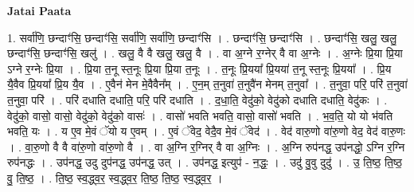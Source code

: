 \documentclass[17pt]{extarticle}
\begin{document}
\textbf{Jatai Paata} \newline

1. सर्वा॑णि॒ छन्दाꣳ॑सि॒ छन्दाꣳ॑सि॒ सर्वा॑णि॒ सर्वा॑णि॒ छन्दाꣳ॑सि । . छन्दाꣳ॑सि॒ छन्दाꣳ॑सि । . छन्दाꣳ॑सि॒ खलु॒ खलु॒ छन्दाꣳ॑सि॒ छन्दाꣳ॑सि॒ खलु॑ । . खलु॒ वै वै खलु॒ खलु॒ वै । . वा अ॒ग्ने र॒ग्नेर् वै वा अ॒ग्नेः । . अ॒ग्नेः प्रि॒या प्रि॒या ऽग्ने र॒ग्नेः प्रि॒या । . प्रि॒या त॒नू स्त॒नूः प्रि॒या प्रि॒या त॒नूः । . त॒नूः प्रि॒यया᳚ प्रि॒यया॑ त॒नू स्त॒नूः प्रि॒यया᳚ । . प्रि॒य यै॒वैव प्रि॒यया᳚ प्रि॒य यै॒व । . ए॒वैन॑ मेन मे॒वैवैन᳚म् । . ए॒न॒म् त॒नुवा॑ त॒नुवै॑न मेनम् त॒नुवा᳚ । . त॒नुवा॒ परि॒ परि॑ त॒नुवा॑ त॒नुवा॒ परि॑ । . परि॑ दधाति दधाति॒ परि॒ परि॑ दधाति । . द॒धा॒ति॒ वेदु॑को॒ वेदु॑को दधाति दधाति॒ वेदु॑कः । . वेदु॑को॒ वासो॒ वासो॒ वेदु॑को॒ वेदु॑को॒ वासः॑ । . वासो॑ भवति भवति॒ वासो॒ वासो॑ भवति । . भ॒व॒ति॒ यो यो भ॑वति भवति॒ यः । . य ए॒व मे॒वं ॅयो य ए॒वम् । . ए॒वं ॅवेद॒ वेदै॒व मे॒वं ॅवेद॑ । . वेद॑ वारु॒णो वा॑रु॒णो वेद॒ वेद॑ वारु॒णः । . वा॒रु॒णो वै वै वा॑रु॒णो वा॑रु॒णो वै । . वा अ॒ग्नि र॒ग्निर् वै वा अ॒ग्निः । . अ॒ग्नि रुप॑नद्ध॒ उप॑नद्धो॒ ऽग्नि र॒ग्नि रुप॑नद्धः । . उप॑नद्ध॒ उदु दुप॑नद्ध॒ उप॑नद्ध॒ उत् । . उप॑नद्ध॒ इत्युप॑ - न॒द्धः॒ । . उदु॑ वु॒वु दुदु॑ । . उ॒ ति॒ष्ठ॒ ति॒ष्ठ॒ वु॒ ति॒ष्ठ॒ । . ति॒ष्ठ॒ स्व॒द्ध्व॒र॒ स्व॒द्ध्व॒र॒ ति॒ष्ठ॒ ति॒ष्ठ॒ स्व॒द्ध्व॒र॒ । \newline
\end{document}
